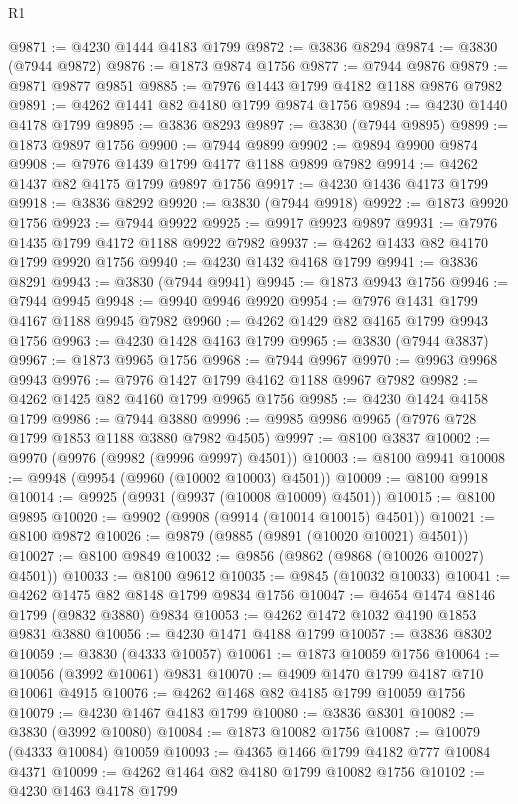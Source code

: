 \begin{lexlean}{R1}
\begin{coremodule}
@9871 := @4230 @1444 @4183 @1799
@9872 := @3836 @8294
@9874 := @3830 (@7944 @9872)
@9876 := @1873 @9874 @1756
@9877 := @7944 @9876
@9879 := @9871 @9877 @9851
@9885 := @7976 @1443 @1799 @4182 @1188 @9876 @7982
@9891 := @4262 @1441 @82 @4180 @1799 @9874 @1756
@9894 := @4230 @1440 @4178 @1799
@9895 := @3836 @8293
@9897 := @3830 (@7944 @9895)
@9899 := @1873 @9897 @1756
@9900 := @7944 @9899
@9902 := @9894 @9900 @9874
@9908 := @7976 @1439 @1799 @4177 @1188 @9899 @7982
@9914 := @4262 @1437 @82 @4175 @1799 @9897 @1756
@9917 := @4230 @1436 @4173 @1799
@9918 := @3836 @8292
@9920 := @3830 (@7944 @9918)
@9922 := @1873 @9920 @1756
@9923 := @7944 @9922
@9925 := @9917 @9923 @9897
@9931 := @7976 @1435 @1799 @4172 @1188 @9922 @7982
@9937 := @4262 @1433 @82 @4170 @1799 @9920 @1756
@9940 := @4230 @1432 @4168 @1799
@9941 := @3836 @8291
@9943 := @3830 (@7944 @9941)
@9945 := @1873 @9943 @1756
@9946 := @7944 @9945
@9948 := @9940 @9946 @9920
@9954 := @7976 @1431 @1799 @4167 @1188 @9945 @7982
@9960 := @4262 @1429 @82 @4165 @1799 @9943 @1756
@9963 := @4230 @1428 @4163 @1799
@9965 := @3830 (@7944 @3837)
@9967 := @1873 @9965 @1756
@9968 := @7944 @9967
@9970 := @9963 @9968 @9943
@9976 := @7976 @1427 @1799 @4162 @1188 @9967 @7982
@9982 := @4262 @1425 @82 @4160 @1799 @9965 @1756
@9985 := @4230 @1424 @4158 @1799
@9986 := @7944 @3880
@9996 := @9985 @9986 @9965 (@7976 @728 @1799 @1853 @1188 @3880 @7982 @4505)
@9997 := @8100 @3837
@10002 := @9970 (@9976 (@9982 (@9996 @9997) @4501))
@10003 := @8100 @9941
@10008 := @9948 (@9954 (@9960 (@10002 @10003) @4501))
@10009 := @8100 @9918
@10014 := @9925 (@9931 (@9937 (@10008 @10009) @4501))
@10015 := @8100 @9895
@10020 := @9902 (@9908 (@9914 (@10014 @10015) @4501))
@10021 := @8100 @9872
@10026 := @9879 (@9885 (@9891 (@10020 @10021) @4501))
@10027 := @8100 @9849
@10032 := @9856 (@9862 (@9868 (@10026 @10027) @4501))
@10033 := @8100 @9612
@10035 := @9845 (@10032 @10033)
@10041 := @4262 @1475 @82 @8148 @1799 @9834 @1756
@10047 := @4654 @1474 @8146 @1799 (@9832 @3880) @9834
@10053 := @4262 @1472 @1032 @4190 @1853 @9831 @3880
@10056 := @4230 @1471 @4188 @1799
@10057 := @3836 @8302
@10059 := @3830 (@4333 @10057)
@10061 := @1873 @10059 @1756
@10064 := @10056 (@3992 @10061) @9831
@10070 := @4909 @1470 @1799 @4187 @710 @10061 @4915
@10076 := @4262 @1468 @82 @4185 @1799 @10059 @1756
@10079 := @4230 @1467 @4183 @1799
@10080 := @3836 @8301
@10082 := @3830 (@3992 @10080)
@10084 := @1873 @10082 @1756
@10087 := @10079 (@4333 @10084) @10059
@10093 := @4365 @1466 @1799 @4182 @777 @10084 @4371
@10099 := @4262 @1464 @82 @4180 @1799 @10082 @1756
@10102 := @4230 @1463 @4178 @1799

\end{coremodule}
\end{lexlean}
